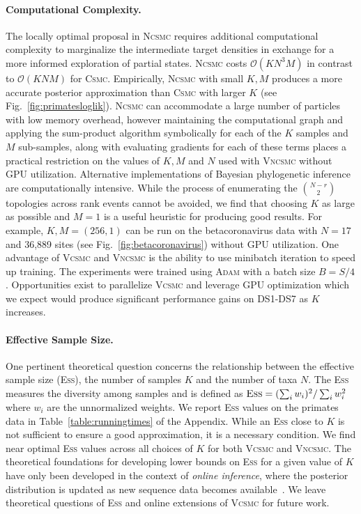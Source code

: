 \documentclass[accepted]{uai2021} %
\theoremstyle{definition}
\begin{document}
\paragraph{Computational Complexity.} The locally optimal proposal in \textsc{Ncsmc} requires additional computational complexity to marginalize the intermediate target densities in exchange for a more informed exploration of partial states. \textsc{Ncsmc} costs $\mathcal{O}(KN^3M)$ in contrast to $\mathcal{O}(KNM)$ for \textsc{Csmc}. Empirically, \textsc{Ncsmc} with small $K,M$ produces a more accurate posterior approximation than \textsc{Csmc} with larger $K$ (see Fig.~\ref{fig:primatesloglik}). \textsc{Ncsmc} can accommodate a large number of particles with low memory overhead, however maintaining the computational graph and applying the sum-product algorithm symbolically for each of the $K$ samples and $M$ sub-samples, along with evaluating gradients for each of these terms places a practical restriction on the values of $K,M$ and $N$ used with \textsc{Vncsmc} without GPU utilization. Alternative implementations of Bayesian phylogenetic inference are computationally intensive. %
While the process of enumerating the ${N-r \choose 2}$ topologies across rank events cannot be avoided, we find that choosing $K$ as large as possible and $M=1$ is a useful heuristic for producing good results. For example, $K,M=(256,1)$ can be run on the betacoronavirus data with $N=17$ and 36,889 sites (see Fig.~\ref{fig:betacoronavirus}) without GPU utilization. One advantage of \textsc{Vcsmc} and \textsc{Vncsmc} is the ability to use minibatch iteration to speed up training. The experiments were
trained using \textsc{Adam} with a batch size $B = S/4$. Opportunities exist to parallelize \textsc{Vcsmc} and leverage GPU optimization which we expect would produce significant performance gains on DS1-DS7 as $K$ increases. 

\paragraph{Effective Sample Size.} One pertinent theoretical question concerns the relationship between the effective sample size (\textsc{Ess}), the number of samples $K$ and the number of taxa $N$.  The \textsc{Ess} measures the diversity among samples and is defined as $\textsc{Ess} = (\sum_i w_i)^2 / \sum_i w_i^2$ where $w_i$ are the unnormalized weights. We report \textsc{Ess} values on the primates data in Table~\ref{table:runningtimes} of the Appendix. While an \textsc{Ess} close to $K$ is not sufficient to ensure a good approximation, it is a necessary condition. We find near optimal \textsc{Ess} values across all choices of $K$ for both \textsc{Vcsmc} and \textsc{Vncsmc}. The theoretical foundations for developing lower bounds on \textsc{Ess} for a given value of $K$ have only been developed in the context of \textit{online inference}, where the posterior distribution is updated as new sequence data becomes available~\citep{10.1093/sysbio/syx087}. We leave theoretical questions of \textsc{Ess} and online extensions of \textsc{Vcsmc} for future work.
\end{document}
